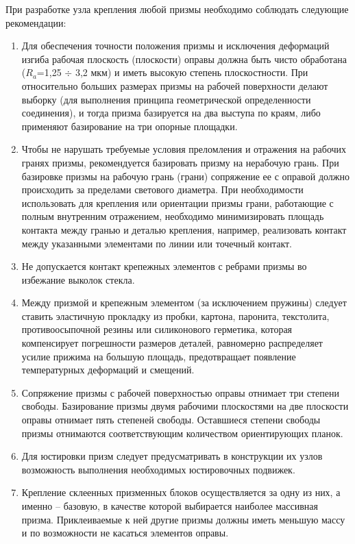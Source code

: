 При разработке узла крепления любой призмы необходимо соблюдать следующие рекомендации:
\begin{enumerate}[leftmargin=*]
\item Для обеспечения точности положения призмы и исключения деформаций изгиба рабочая плоскость (плоскости) оправы должна быть чисто обработана ($ R_a $=1,25 $ \div $ 3,2 мкм) и иметь высокую степень плоскостности. При относительно больших размерах призмы на рабочей поверхности делают выборку (для выполнения принципа геометрической определенности соединения), и тогда призма базируется на два выступа по краям, либо применяют базирование на три опорные площадки.
\item Чтобы не нарушать требуемые условия преломления и отражения на рабочих гранях призмы, рекомендуется базировать призму на нерабочую грань. При базировке призмы на рабочую грань (грани) сопряжение ее с оправой должно происходить за пределами светового диаметра. При необходимости использовать для крепления или ориентации призмы грани, работающие с полным внутренним отражением, необходимо минимизировать площадь контакта между гранью и деталью крепления, например, реализовать контакт между указанными элементами по линии или точечный контакт.
\item Не допускается контакт крепежных элементов с ребрами призмы во избежание выколок стекла.
\item Между призмой и крепежным элементом (за исключением пружины) следует ставить эластичную прокладку из пробки, картона, паронита, текстолита, противоосыпочной резины или силиконового герметика, которая компенсирует погрешности размеров деталей, равномерно распределяет усилие прижима на большую площадь, предотвращает появление температурных деформаций и смещений.
\item Сопряжение призмы с рабочей поверхностью оправы отнимает три степени свободы. Базирование призмы двумя рабочими плоскостями на две плоскости оправы отнимает пять степеней свободы. Оставшиеся степени свободы призмы отнимаются соответствующим количеством ориентирующих планок.
\item Для юстировки призм следует предусматривать в конструкции их узлов возможность выполнения необходимых юстировочных подвижек.
\item Крепление склеенных призменных блоков осуществляется за одну из них, а именно -- базовую, в качестве которой выбирается наиболее массивная призма. Приклеиваемые к ней другие призмы должны иметь меньшую массу и по возможности не касаться элементов оправы.
\end{enumerate}

